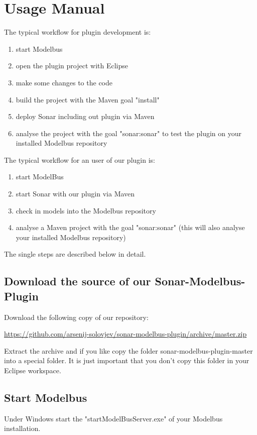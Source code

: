 \section{Usage Manual}

The typical workflow for plugin development is:
\begin{enumerate}
	\item start Modelbus
	\item open the plugin project with Eclipse 
	\item make some changes to the code
	\item build the project with the Maven goal "install"
	\item deploy Sonar including out plugin via Maven
	\item analyse the project with the goal "sonar:sonar" to test the plugin on your installed Modelbus repository
\end{enumerate}

The typical workflow for an user of our plugin is:
\begin{enumerate}
	\item start ModelBus
	\item start Sonar with our plugin via Maven
	\item check in models into the Modelbus repository
	\item analyse a Maven project with the goal "sonar:sonar" (this will also analyse your installed Modelbus repository)
\end{enumerate}

The single steps are described below in detail.



\subsection{Download the source of our Sonar-Modelbus-Plugin}
Download the following copy of our repository:

\url{https://github.com/arsenij-solovjev/sonar-modelbus-plugin/archive/master.zip}

Extract the archive and if you like copy the folder sonar-modelbus-plugin-master into a special folder. It is just important that you don't copy this folder in your Eclipse workspace.



\subsection{Start Modelbus}
Under Windows start the "startModelBusServer.exe" of your Modelbus installation.

